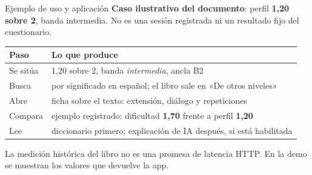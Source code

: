 \documentclass[aspectratio=169,11pt]{beamer}
\begin{document}
\begin{frame}{Ejemplo de uso y aplicación}
\vspace{1mm}
{\small \textbf{Caso ilustrativo del documento}: perfil \textbf{1,20 sobre 2},
banda intermedia. No es una sesión registrada ni un resultado fijo del cuestionario.}
\vspace{2mm}

\begin{center}
\end{center}

\vspace{2mm}
\begin{center}\small
\begin{tabular}{@{}l l@{}}
\toprule
\textbf{Paso} & \textbf{Lo que produce} \\
\midrule
Se sitúa & 1,20 sobre 2, banda \emph{intermedia}, ancla B2 \\
Busca & por significado en español; el libro sale en «De otros niveles» \\
Abre & ficha sobre el texto: extensión, diálogo y repeticiones \\
Compara & ejemplo registrado: dificultad \textbf{1,70} frente a perfil \textbf{1,20} \\
Lee & diccionario primero; explicación de IA después, si está habilitada \\
\bottomrule
\end{tabular}
\end{center}

\vspace{1mm}
{\footnotesize\color{llgris} La medición histórica del libro no es una promesa
de latencia HTTP. En la demo se muestran los valores que devuelve la app.}
\end{frame}
\end{document}
